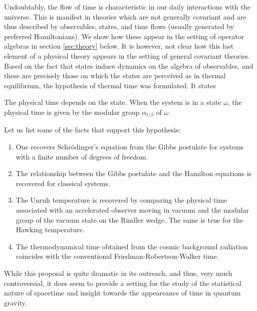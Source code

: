 \documentclass{article}
\begin{document}
Undoubtably, the flow of time is characteristic in our daily interactions with the universe. This is manifest in theories which are not generally covariant and are thus described by observables, states, and time flows (usually generated by preferred Hamiltonians). We show how these appear in the setting of operator algebras in section \ref{sec:theory} below. It is however, not clear how this last element of a physical theory appears in the setting of general covariant theories. Based on the fact that states induce dynamics on the algebra of observables, and these are precisely those on which the states are perceived as in thermal equilibrium, the hypothesis of thermal time was formulated\cite{Connes1994a}. It states
\begin{displayquote}
The physical time depends on the state. When the system is in a state $\omega$, the physical time is given by the modular group $\alpha_{t/\beta}$ of $\omega$.
\end{displayquote}
Let us list some of the facts that support this hypothesis:
\begin{enumerate}
\item One recovers Schrödinger's equation from the Gibbs postulate for systems with a finite number of degrees of freedom. 
\item The relationship between the Gibbs postulate and the Hamilton equations is recovered for classical systems.
\item The Unruh temperature is recovered by comparing the physical time associated with an accelerated observer moving in vacuum and the modular group of the vacuum state on the Rindler wedge\cite{Bisognano1975, Bisognano1976}. The same is true for the Hawking temperature.
\item The thermodynamical time obtained from the cosmic background radiation coincides with the conventional Friedman-Robertson-Walker time\cite{Rovelli1993a}.
\end{enumerate}
While this proposal is quite dramatic in its outreach, and thus, very much controversial, it does seem to provide a setting for the study of the statistical nature of spacetime and insight towards the appeareance of time in quantum gravity\cite{Rovelli2009, Paetz2002, Martinetti2013}.
\end{document}
